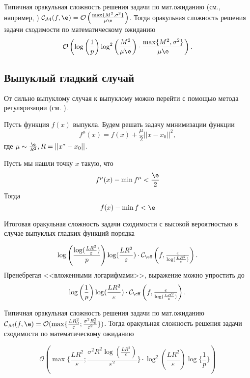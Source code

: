 Типичная оракульная сложность решения задачи по мат.ожиданию (см., например, \cite{гасников2018современные}) $\mathcal{C}_{\mathcal{M}}(f, \e) = \mathcal{O}\left(\frac{\max\{M^2, \sigma^2\}}{\mu \e}\right)$. Тогда оракульная сложность решения задачи сходимости по математическому ожиданию 
\begin{equation}
    \mathcal{O}\left(\log\left(\frac{1}{p}\right)\log^2\left(\frac{M^2}{\mu \e}\right)\cdot \frac{\max\{M^2, \sigma^2\}}{\mu \e}\right).
\end{equation}


\subsection{Выпуклый гладкий случай}
От сильно выпуклому случая к выпуклому можно перейти с помощью метода регуляризации (см. \cite{воронцова2021выпуклая}).

\begin{theorem}
    Пусть функция $f(x)$ выпукла. Будем решать задачу минимизации функции \[f^{\mu}(x) = f(x) + \frac{\mu}{2} ||x - x_0||^2,\] где $\mu \sim \frac{\e}{R^2}, R = ||x^* - x_0||$.

    Пусть мы нашли точку $x$ такую, что
    \[f^{\mu}(x) - \min f^{\mu} < \frac{\e}{2}\]
    Тогда 
    \[f(x) - \min f < \e\]
\end{theorem}

\begin{theorem}[Рубцов, 2025] \label{th: convex smooth}
    Итоговая оракульная сложность задачи сходимости с высокой вероятностью в случае выпуклых гладких функций порядка

    $$ \log\left(\frac{\log(\frac{LR^2}{\varepsilon})}{p}\right)\log(\frac{LR^2}{\varepsilon})\cdot \mathcal{C}_{\cM}\left(f,\tfrac{\epsilon}{\log(\frac{LR^2}{\varepsilon})}\right).$$
    Пренебрегая <<вложенными логарифмами>>, выражение можно упростить до
    $$ \log\left(\frac{1}{p}\right)\log(\frac{LR^2}{\varepsilon})\cdot \mathcal{C}_{\cM}\left(f,\tfrac{\epsilon}{\log(\frac{LR^2}{\varepsilon})}\right).$$ 
\end{theorem}

Типичная оракульная сложность решения задачи по мат.ожиданию  $\mathcal{C}_{\mathcal{M}}(f, \e) = \mathcal{O} (\max\{\frac{LR_0^2}{\varepsilon}; \frac{\sigma^2 R_0^2}{\varepsilon^2}\})$. Тогда оракульная сложность решения задачи сходимости по математическому ожиданию 
 
    \begin{equation}
        \mathcal{O} (\max\{ \frac{LR^2 }{\varepsilon}; \frac{\sigma^2 R^2 \log(\frac{LR^2}{\varepsilon})}{\varepsilon^2}\} \cdot \log^2(\frac{LR^2}{\varepsilon})\log\{\frac{1}{p}\})
    \end{equation}

